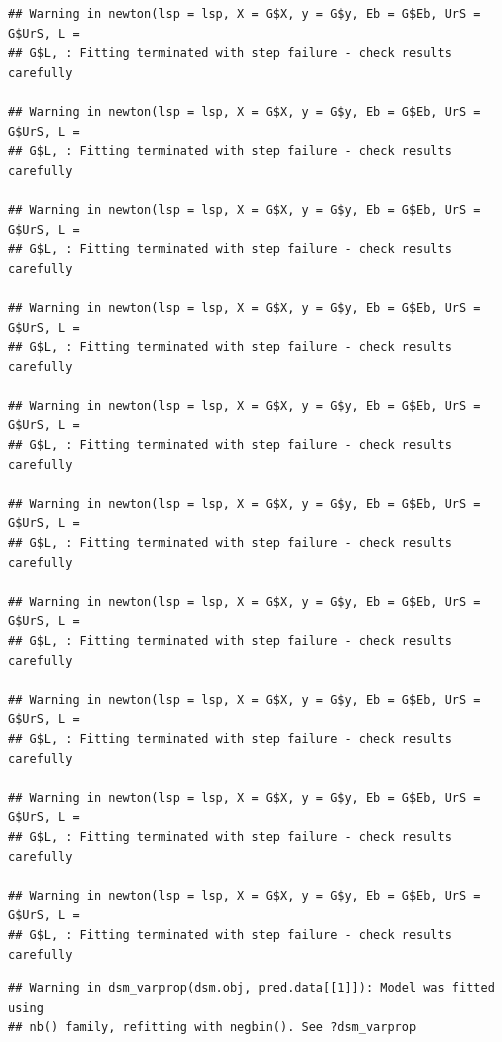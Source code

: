 \documentclass[]{book}
\theoremstyle{definition}
\theoremstyle{definition}
\theoremstyle{remark}
\begin{document}
\begin{verbatim}
## Warning in newton(lsp = lsp, X = G$X, y = G$y, Eb = G$Eb, UrS = G$UrS, L =
## G$L, : Fitting terminated with step failure - check results carefully

## Warning in newton(lsp = lsp, X = G$X, y = G$y, Eb = G$Eb, UrS = G$UrS, L =
## G$L, : Fitting terminated with step failure - check results carefully

## Warning in newton(lsp = lsp, X = G$X, y = G$y, Eb = G$Eb, UrS = G$UrS, L =
## G$L, : Fitting terminated with step failure - check results carefully

## Warning in newton(lsp = lsp, X = G$X, y = G$y, Eb = G$Eb, UrS = G$UrS, L =
## G$L, : Fitting terminated with step failure - check results carefully

## Warning in newton(lsp = lsp, X = G$X, y = G$y, Eb = G$Eb, UrS = G$UrS, L =
## G$L, : Fitting terminated with step failure - check results carefully

## Warning in newton(lsp = lsp, X = G$X, y = G$y, Eb = G$Eb, UrS = G$UrS, L =
## G$L, : Fitting terminated with step failure - check results carefully

## Warning in newton(lsp = lsp, X = G$X, y = G$y, Eb = G$Eb, UrS = G$UrS, L =
## G$L, : Fitting terminated with step failure - check results carefully

## Warning in newton(lsp = lsp, X = G$X, y = G$y, Eb = G$Eb, UrS = G$UrS, L =
## G$L, : Fitting terminated with step failure - check results carefully

## Warning in newton(lsp = lsp, X = G$X, y = G$y, Eb = G$Eb, UrS = G$UrS, L =
## G$L, : Fitting terminated with step failure - check results carefully

## Warning in newton(lsp = lsp, X = G$X, y = G$y, Eb = G$Eb, UrS = G$UrS, L =
## G$L, : Fitting terminated with step failure - check results carefully
\end{verbatim}

\begin{verbatim}
## Warning in dsm_varprop(dsm.obj, pred.data[[1]]): Model was fitted using
## nb() family, refitting with negbin(). See ?dsm_varprop
\end{verbatim}
\end{document}
